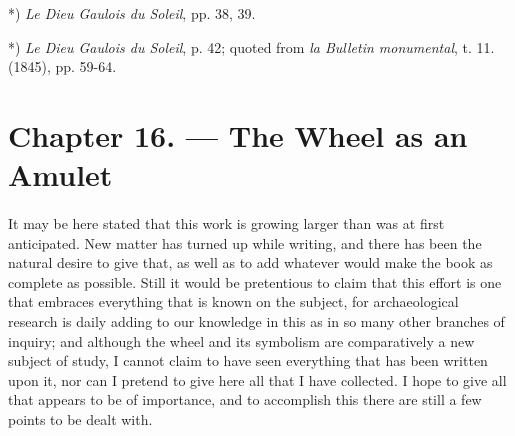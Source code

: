 \documentclass[a4paper, 11pt, oneside, polutonikogreek, english]{article}
\begin{document}
*) \emph{Le Dieu Gaulois du Soleil}, pp. 38, 39.

*) \emph{Le Dieu Gaulois du Soleil}, p. 42; quoted from \emph{la Bulletin monumental}, t. 11. (1845), pp. 59-64.
\clearpage
\section{Chapter 16. --- The Wheel as an Amulet}
\paragraph{}
It may be here stated that this work is growing larger than was at first anticipated. New matter has turned up while writing, and there has been the natural desire to give that, as well as to add whatever would make the book as complete as possible. Still it would be pretentious to claim that this effort is one that embraces everything that is known on the subject, for archaeological research is daily adding to our knowledge in this as in so many other branches of inquiry; and although the wheel and its symbolism are comparatively a new subject of study, I cannot claim to have seen everything that has been written upon it, nor can I pretend to give here all that I have collected. I hope to give all that appears to be of importance, and to accomplish this there are still a few points to be dealt with.
\end{document}
